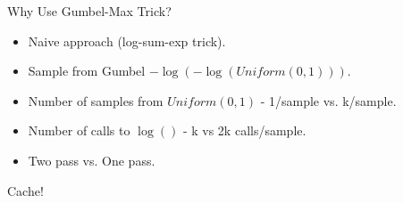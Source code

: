 \begin{frame}{Why Use Gumbel-Max Trick?}
  \begin{itemize}[<+->]
  \item Naive approach (log-sum-exp trick).
  \item Sample from Gumbel $-\log(-\log(Uniform(0,1)))$.
  \item Number of samples from $Uniform(0,1)$ - 1/sample vs. k/sample.
  \item Number of calls to $\log()$ - k vs 2k calls/sample.
  \item Two pass vs. One pass.
  \end{itemize}
  \begin{center}
    Cache!
  \end{center}
\end{frame}

